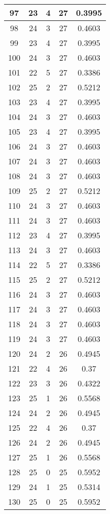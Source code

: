 \documentclass[letterpaper, 12pt]{article}
\begin{document}
\begin{longtable}{|c|c|c|c|c|}
\hline
97 & 23 & 4 & 27 & 0.3995 \\
\hline
98 & 24 & 3 & 27 & 0.4603 \\
\hline
99 & 23 & 4 & 27 & 0.3995 \\
\hline
100 & 24 & 3 & 27 & 0.4603 \\
\hline
101 & 22 & 5 & 27 & 0.3386 \\
\hline
102 & 25 & 2 & 27 & 0.5212 \\
\hline
103 & 23 & 4 & 27 & 0.3995 \\
\hline
104 & 24 & 3 & 27 & 0.4603 \\
\hline
105 & 23 & 4 & 27 & 0.3995 \\
\hline
106 & 24 & 3 & 27 & 0.4603 \\
\hline
107 & 24 & 3 & 27 & 0.4603 \\
\hline
108 & 24 & 3 & 27 & 0.4603 \\
\hline
109 & 25 & 2 & 27 & 0.5212 \\
\hline
110 & 24 & 3 & 27 & 0.4603 \\
\hline
111 & 24 & 3 & 27 & 0.4603 \\
\hline
112 & 23 & 4 & 27 & 0.3995 \\
\hline
113 & 24 & 3 & 27 & 0.4603 \\
\hline
114 & 22 & 5 & 27 & 0.3386 \\
\hline
115 & 25 & 2 & 27 & 0.5212 \\
\hline
116 & 24 & 3 & 27 & 0.4603 \\
\hline
117 & 24 & 3 & 27 & 0.4603 \\
\hline
118 & 24 & 3 & 27 & 0.4603 \\
\hline
119 & 24 & 3 & 27 & 0.4603 \\
\hline
120 & 24 & 2 & 26 & 0.4945 \\
\hline
121 & 22 & 4 & 26 & 0.37 \\
\hline
122 & 23 & 3 & 26 & 0.4322 \\
\hline
123 & 25 & 1 & 26 & 0.5568 \\
\hline
124 & 24 & 2 & 26 & 0.4945 \\
\hline
125 & 22 & 4 & 26 & 0.37 \\
\hline
126 & 24 & 2 & 26 & 0.4945 \\
\hline
127 & 25 & 1 & 26 & 0.5568 \\
\hline
128 & 25 & 0 & 25 & 0.5952 \\
\hline
129 & 24 & 1 & 25 & 0.5314 \\
\hline
130 & 25 & 0 & 25 & 0.5952 \\

\end{longtable}
\end{document}
